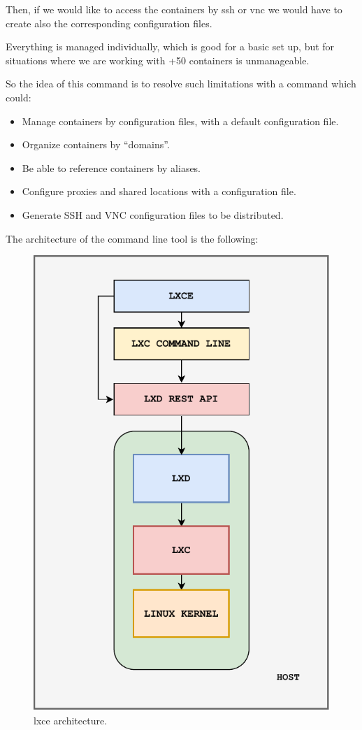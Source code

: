 Then, if we would like to access the containers by ssh or vnc we would have to create also the corresponding configuration files.

Everything is managed individually, which is good for a basic set up, but for situations where we are working with +50 containers is unmanageable. 

So the idea of this command is to resolve such limitations with a command which could:
\begin{itemize}
	\item{Manage containers by configuration files, with a default configuration file.}
	\item{Organize containers by ``domains''.}
	\item{Be able to reference containers by aliases.}
	\item{Configure proxies and shared locations with a configuration file.}
	\item{Generate SSH and VNC configuration files to be distributed.}
\end{itemize}

The architecture of the command line tool is the following:
\begin{figure}[H]
	\label{fig:lxce architecture}
	\centering
	\includegraphics{img/03/lxce-diagram.pdf}
	\caption[lxce architecture]{\footnotesize{lxce architecture.}}
\end{figure}

